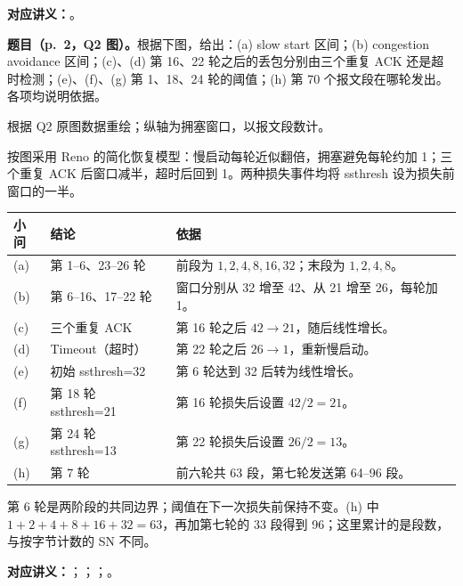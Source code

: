 \textbf{对应讲义：}。

\textbf{题目（p.~2，Q2 图）。}根据下图，给出：(a) slow start 区间；(b) congestion avoidance 区间；(c)、(d) 第 16、22 轮之后的丢包分别由三个重复 ACK 还是超时检测；(e)、(f)、(g) 第 1、18、24 轮的阈值；(h) 第 70 个报文段在哪轮发出。各项均说明依据。

\begin{center}


{\footnotesize 根据 Q2 原图数据重绘；纵轴为拥塞窗口，以报文段数计。}
\end{center}

\begin{checkedsolution}
按图采用 Reno 的简化恢复模型：慢启动每轮近似翻倍，拥塞避免每轮约加 1；三个重复 ACK 后窗口减半，超时后回到 1。两种损失事件均将 ssthresh 设为损失前窗口的一半。
\begin{center}
\small
\begin{tabularx}{\textwidth}{@{}l>{\raggedright\arraybackslash}p{4.3cm}X@{}}
\toprule
小问 & 结论 & 依据 \\
\midrule
(a) & 第 1--6、23--26 轮 & 前段为 $1,2,4,8,16,32$；末段为 $1,2,4,8$。\\
(b) & 第 6--16、17--22 轮 & 窗口分别从 32 增至 42、从 21 增至 26，每轮加 1。\\
(c) & 三个重复 ACK & 第 16 轮之后 $42\to21$，随后线性增长。\\
(d) & Timeout（超时） & 第 22 轮之后 $26\to1$，重新慢启动。\\
(e) & 初始 ssthresh=32 & 第 6 轮达到 32 后转为线性增长。\\
(f) & 第 18 轮 ssthresh=21 & 第 16 轮损失后设置 $42/2=21$。\\
(g) & 第 24 轮 ssthresh=13 & 第 22 轮损失后设置 $26/2=13$。\\
(h) & 第 7 轮 & 前六轮共 63 段，第七轮发送第 64--96 段。\\
\bottomrule
\end{tabularx}
\end{center}
第 6 轮是两阶段的共同边界；阈值在下一次损失前保持不变。(h) 中 $1+2+4+8+16+32=63$，再加第七轮的 33 段得到 96；这里累计的是段数，与按字节计数的 SN 不同。
\end{checkedsolution}

\textbf{对应讲义：}；；；。

